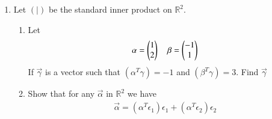 \renewcommand{\theequation}{\theenumi}
\renewcommand{\thefigure}{\theenumi}
\begin{enumerate}[label=\thesubsection.\arabic*.,ref=\thesubsection.\theenumi]

\item Let $( | )$ be the standard inner product on $\mathbb{R}^2$.
\begin{enumerate}
\item Let 
\begin{align}
\mathbf{\alpha} = \begin{pmatrix}1\\ 2\end{pmatrix} \quad \mathbf{\beta} = \begin{pmatrix}-1\\ 1\end{pmatrix}
\end{align}
If $\vec{\gamma}$ is a vector such that $(\alpha^T\gamma)=-1$ and $(\beta^T\gamma)=3$. Find $\vec{\gamma}$
\item Show that for any $\vec{\alpha}$ in $\mathbb{R}^2$ we have
\begin{align}
\vec{\alpha} = (\alpha^T\epsilon_1)\epsilon_1 + (\alpha^T\epsilon_2)\epsilon_2 \label{eq:0}
\end{align} 
\end{enumerate}
%
\solution

\end{enumerate}
